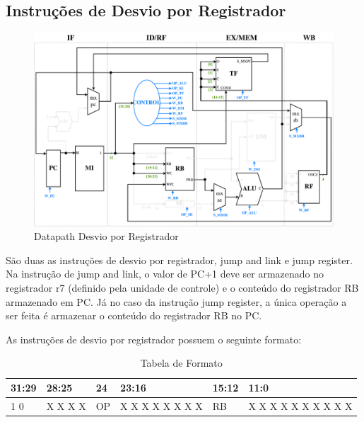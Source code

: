 \documentclass{report}
\begin{document}
\newpage
\subsection{Instruções de Desvio por Registrador}
\begin{figure}[H]
\centering
\includegraphics[width=\textwidth]{./pictures/DatapathDER.pdf}
\caption{Datapath Desvio por Registrador}
\end{figure}
São duas as instruções de desvio por registrador, jump and link e jump register. Na instrução de jump and link, o valor de PC+1 deve ser armazenado no registrador r7 (definido pela unidade de controle) e o conteúdo do registrador RB armazenado em PC. Já no caso da instrução jump register, a única operação a ser feita é armazenar o conteúdo do registrador RB no PC.\newline

As instruções de desvio por registrador possuem o seguinte formato:

\FloatBarrier
\begin{table}[H]
  \begin{center}
  \renewcommand{\arraystretch}{1.46}
    \begin{tabular}[pos]{|>{\centering\arraybackslash}m{33pt}|>{\centering\arraybackslash}m{44pt}|>{\centering\arraybackslash}m{29pt}|>{\centering\arraybackslash}m{90pt}|>{\centering\arraybackslash}m{44pt}|>{\centering\arraybackslash}m{112pt}|} \hline
      \cellcolor[gray]{0.9}\textbf{31:29} & \cellcolor[gray]{0.9}\textbf{28:25} & \cellcolor[gray]{0.9}\textbf{24} & \cellcolor[gray]{0.9}\textbf{23:16} & \cellcolor[gray]{0.9}\textbf{15:12} & \cellcolor[gray]{0.9}\textbf{11:0} \\ \hline
        1 1 0       & X X X X       & OP        & X X X X X X X X       & RB        & X X X X X X X X X X \\ \hline
    \end{tabular}
    \caption{Tabela de Formato}
  \end{center}
\end{table}  
\end{document}
